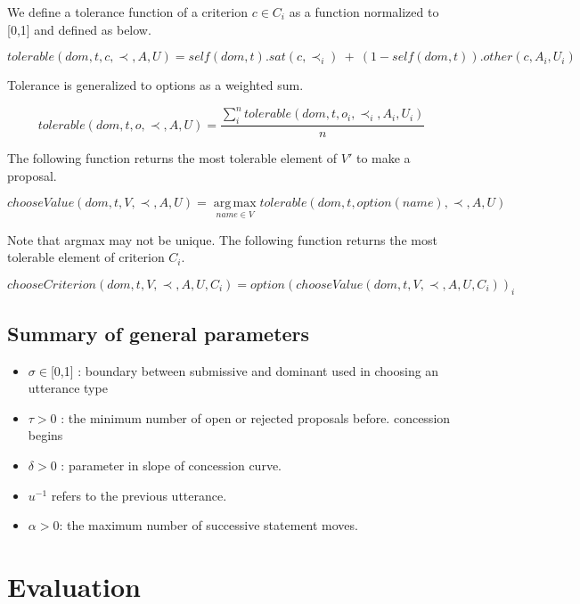 \documentclass{llncs}
\begin{document}
	We define a tolerance function of a criterion $c \in C_i$ as a function normalized to [0,1] and defined as below.
	
	$$tolerable(dom, t, c, \prec, A, U) = self(dom, t) . sat(c, \prec_i) \ +\  (1 - self(dom, t)) . other(c, A_i, U_i)$$
	
	Tolerance is generalized to options as a weighted sum.
	
	$$tolerable(dom, t, o, \prec, A, U) = \frac{ \sum_{i}^{n} tolerable(dom, t, o_i, \prec_i, A_i, U_i) } {n}$$ 
	
	
	
	The following function returns the most tolerable element of $V'$ to make a proposal.
	
	$$ chooseValue(dom, t, V, \prec, A, U) =	\operatorname*{arg\,max}_{name \in V} tolerable(dom, t, option(name), \prec, A, U) $$
	
	Note that argmax may not be unique.  The following function returns the most tolerable element of	criterion $C_i$.
	
	$$chooseCriterion(dom, t, V, \prec, A, U, C_i) = option(chooseValue(dom, t, V, \prec, A, U, C_i))_i$$
	
	
	
	
	\subsection{Summary of general parameters }
	\begin{itemize}
		
		\item $\sigma \in $[0,1] : boundary between submissive and dominant used in
		choosing an utterance type
		\item $\tau > 0$ : the minimum number of open or rejected proposals before.
		concession begins
		\item $\delta > 0$ : parameter in slope of concession curve.
		\item $u^{-1}$ refers to the previous utterance.
		\item $\alpha> 0$: the maximum number of successive statement moves.
		
		
	\end{itemize}
	

			  
	\section{Evaluation}
	
\end{document}
